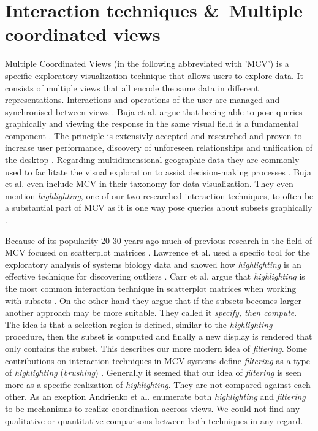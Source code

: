 \section{Interaction techniques \&\ Multiple coordinated views}
Multiple Coordinated Views (in the following abbreviated with ’MCV’) is a specific exploratory visualization technique that allows users to explore data.
It consists of multiple views that all encode the same data in different representations. Interactions and
operations of the user are managed and synchronised between views \citep*{Roberts.722007722007}. Buja et al. argue that
beeing able to pose queries graphically and viewing the response in the same visual field is a fundamental component
\citep*{Buja.1996}. The principle is extensivly accepted and researched and proven to increase user performance, discovery
of unforeseen relationships and unification of the desktop \citep*{North.1998}. Regarding multidimensional geographic data they are
commonly used to facilitate the visual exploration to assist decision-making processes \citep*{Andrienko.2020}.
Buja et al. even include MCV in their taxonomy for data visualization. They even mention \textit{highlighting}, one of our two researched
interaction techniques, to often be a substantial part of MCV as it is one way pose queries about subsets graphically \citep*{Buja.1996}.

Because of its popularity 20-30 years ago much of previous research in the field of MCV focused on
scatterplot matrices \citep*{Carr.1987, Becker.1987}. Lawrence et al. used a specfic tool for the exploratory analysis of systems biology data
and showed how \textit{highlighting} is an effective technique for discovering outliers \citep*{Lawrence.2006}.
Carr et al. argue that \textit{highlighting} is the most common interaction technique in scatterplot matrices
when working with subsets \citep*{Carr.1987, Becker.1987}. On the other hand they argue that if the subsets becomes larger
another approach may be more suitable. They called it \textit{specify, then compute}.
The idea is that a selection region is defined, similar to the \textit{highlighting} procedure, then the subset
is computed and finally a new display is rendered that only contains the subset. This describes our more
modern idea of \textit{filtering}.
Some contributions on interaction techniques in MCV systems define \textit{filtering} as a type of
\textit{highlighting} (\textit{brushing}) \citep*{Ward.}. Generally it seemed that our idea of \textit{filtering} is seen more as a specific
realization of \textit{highlighting}. They are not compared against each other. As an exeption Andrienko et al. enumerate both \textit{highlighting}
and \textit{filtering} to be mechanisms to realize coordination accross views. We could not find any qualitative or quantitative comparisons between
both techniques in any regard.